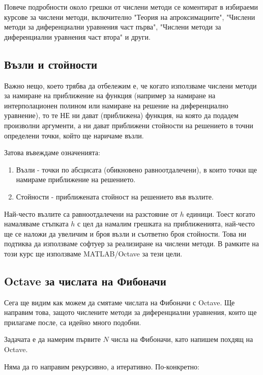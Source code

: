 \documentclass{scrartcl}
\begin{document}
\begin{flushleft}
Повече подробности около грешки от числени методи се коментират в избираеми курсове за числени методи, включително "Теория на апроксимациите", "Числени методи за диференциални уравнения част първа", "Числени методи за диференциални уравнения част втора" и други.

\subsection{Възли и стойности}

Важно нещо, което трябва да отбележим е, че когато използваме числени методи за намиране на приближение на функция (например за намиране на интерполационен полином или намиране на решение на диференциално уравнение), то те НЕ ни дават (приближена) функция, на която да подадем произволни аргументи, а ни дават приближени стойности на решението в точни определени точки, който ще наричаме възли.

Затова въвеждаме означенията:
\begin{enumerate}
    \item Възли - точки по абсцисата (обикновено равноотдалечени), в които точки ще намираме приближение на решението.
    \item Стойности - приближената стойност на решението във възлите.
\end{enumerate}

Най-често възлите са равноотдалечени на разстояние от $h$ единици. Тоест когато намаляваме стъпката $h$ с цел да намалим грешката на приближенията, най-често ще се наложи да увеличим и броя възли и съответно броя стойности. Това ни подтиква да използваме софтуер за реализиране на числени методи. В рамките на този курс ще използваме MATLAB/Octave за тези цели.

\subsection{Octave за числата на Фибоначи}

Сега ще видим как можем да смятаме числата на Фибоначи с Octave. Ще направим това, защото числените методи за диференциални уравнения, които ще прилагаме после, са идейно много подобни.

Задачата е да намерим първите $N$ числа на Фибоначи, като напишем похдящ на Octave.

Няма да го направим рекурсивно, а итеративно. По-конкретно:


\end{flushleft}
\end{document}

